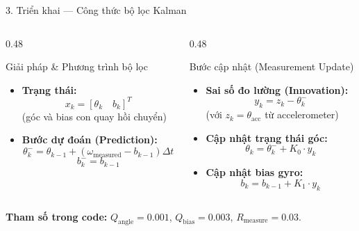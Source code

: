 \documentclass[aspectratio=169, 10pt]{beamer}
\begin{document}
\begin{frame}{3. Triển khai — Công thức bộ lọc Kalman}
  \begin{columns}[T]
    \begin{column}{0.48\textwidth}
      \begin{block}{Giải pháp \& Phương trình bộ lọc}
        \small
        \begin{itemize}
          \item \textbf{Trạng thái:}
            $$x_k = [\theta_k \quad b_k]^T$$
            \scriptsize (góc và bias con quay hồi chuyển)
          \item \small \textbf{Bước dự đoán (Prediction):}
            $$\theta_k^{-} = \theta_{k-1} + (\omega_{\text{measured}} - b_{k-1})\Delta t$$
            $$b_k^{-} = b_{k-1}$$
        \end{itemize}
      \end{block}
    \end{column}
    \begin{column}{0.48\textwidth}
      \begin{block}{Bước cập nhật (Measurement Update)}
        \small
        \begin{itemize}
          \item \textbf{Sai số đo lường (Innovation):}
            $$y_k = z_k - \theta_k^{-}$$
            \scriptsize (với $z_k = \theta_{\text{acc}}$ từ accelerometer)
          \item \small \textbf{Cập nhật trạng thái góc:}
            $$\theta_k = \theta_k^{-} + K_0 \cdot y_k$$
          \item \small \textbf{Cập nhật bias gyro:}
            $$b_k = b_{k-1} + K_1 \cdot y_k$$
        \end{itemize}
      \end{block}
    \end{column}
  \end{columns}
  \vspace{0.2em}
  \centering \scriptsize \textbf{Tham số trong code:} $Q_{\text{angle}} = 0.001$, $Q_{\text{bias}} = 0.003$, $R_{\text{measure}} = 0.03$.
\end{frame}
\end{document}
